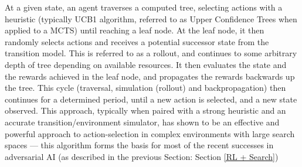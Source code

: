 At a given state, an agent traverses a computed tree, selecting actions with a heuristic (typically UCB1 algorithm, referred to as Upper Confidence Trees when applied to a MCTS) until reaching a leaf node. At the leaf node, it then randomly selects actions and receives a potential successor state from the transition model. This is referred to as a rollout, and continues to some arbitrary depth of tree depending on available resources. It then evaluates the state and the rewards achieved in the leaf node, and propagates the rewards backwards up the tree. This cycle  (traversal, simulation (rollout) and backpropagation) then continues for a determined period, until a new action is selected, and a new state observed. 
\newline \newline
This approach, typically when paired with a strong heuristic and an accurate transition/environment simulator, has shown to be an effective and powerful approach to action-selection in complex environments with large search spaces --- this algorithm forms the basis for most of the recent successes in adversarial AI (as described in the previous Section: Section \ref{RL + Search}) 


